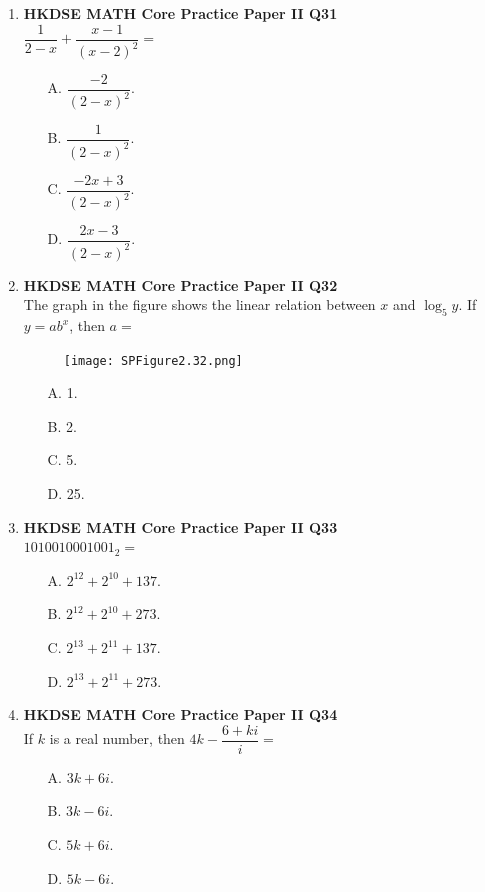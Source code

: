 \documentclass[12pt]{article}
\begin{document}
\begin{enumerate}
	\item \textbf{HKDSE MATH Core Practice Paper II Q31}\\
	$\dfrac{1}{2 - x} + \dfrac{x - 1}{(x - 2)^2} = $
	\begin{enumerate}
		\item[A.] $\dfrac{-2}{(2 - x)^2}$.
		\item[B.] $\dfrac{1}{(2 - x)^2}$.
		\item[C.] $\dfrac{-2x + 3}{(2 - x)^2}$.
		\item[D.] $\dfrac{2x - 3}{(2 - x)^2}$.
	\end{enumerate}
	
	\item \textbf{HKDSE MATH Core Practice Paper II Q32}\\
	The graph in the figure shows the linear relation between $x$ and $\log_5{y}$. If $y = ab^x$, then $a =$
	\begin{figure}[H]
		\centering
		\texttt{[image: SPFigure2.32.png]}	
	\end{figure}
	\begin{enumerate}
		\item[A.] 1.
		\item[B.] 2.
		\item[C.] 5.
		\item[D.] 25.
	\end{enumerate}
	
	\item \textbf{HKDSE MATH Core Practice Paper II Q33}\\
	$1010010001001_2 = $
	\begin{enumerate}
		\item[A.] $2^{12} + 2^{10} + 137$.
		\item[B.] $2^{12} + 2^{10} + 273$.
		\item[C.] $2^{13} + 2^{11} + 137$.
		\item[D.] $2^{13} + 2^{11} + 273$.
	\end{enumerate}
	
	\item \textbf{HKDSE MATH Core Practice Paper II Q34}\\
	If $k$ is a real number, then $4k - \dfrac{6 + ki}{i} = $
	\begin{enumerate}
		\item[A.] $3k + 6i$.
		\item[B.] $3k - 6i$.
		\item[C.] $5k + 6i$.
		\item[D.] $5k - 6i$.
	\end{enumerate}
	

\end{enumerate}
\end{document}
